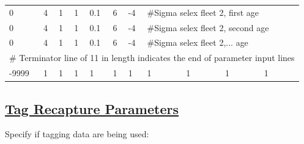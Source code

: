 \begin{longtable}{p{1cm} p{1cm} p{1cm} p{1.25cm} p{1.25cm} p{1.25cm} p{1.2cm} p{1.2cm} p{1cm} p{1cm} p{1cm}}
	\hline
	0 & 4 & 1 & 1 & 0.1 & 6 & -4 & \multicolumn{4}{l}{\#Sigma selex fleet 2, first age} \Tstrut\\
	0 & 4 & 1 & 1 & 0.1 & 6 & -4 & \multicolumn{4}{l}{\#Sigma selex fleet 2, second age} \Tstrut\\
	0 & 4 & 1 & 1 & 0.1 & 6 & -4 & \multicolumn{4}{l}{\#Sigma selex fleet 2,... age} \Tstrut\\
	\hline
	\multicolumn{11}{l}{\# Terminator line of 11 in length indicates the end of parameter input lines} \\
	-9999 & 1 & 1 & 1 & 1 & 1 & 1 & 1 & 1 & 1 & 1 \\
	\hline
\end{longtable}


\hypertarget{tagrecapture}{}
\subsection[Tag Recapture Parameters]{\protect\hyperlink{tagrecapture}{Tag Recapture Parameters}}
Specify if tagging data are being used:



